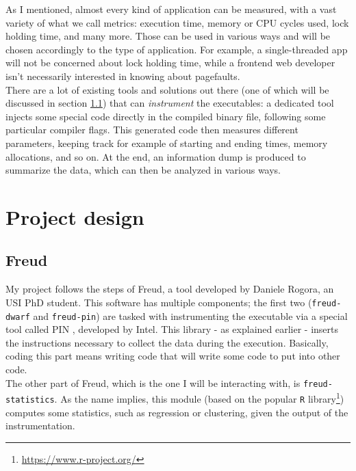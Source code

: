     As I mentioned, almost every kind of application can be measured, with a vast variety of what we call metrics:
    execution time, memory or CPU cycles used, lock holding time, and many more. Those can be used in
    various ways and will be chosen accordingly to the type of application. For example, a single-threaded app
    will not be concerned about lock holding time, while a frontend web developer isn't 
    necessarily interested in knowing about pagefaults.\\

    There are a lot of existing tools and solutions out there (one of which will be discussed in section \ref{sec:freud})
    that can \textit{instrument} the executables: a dedicated tool injects some special code directly in the compiled
    binary file, following some particular compiler flags. This generated code then measures
    different parameters, keeping track for example of starting and ending times, memory allocations, and so on.
    At the end, an information dump is produced to summarize the data, which can then be analyzed in various ways.


\chapter{Project design}

    \section{Freud}\label{sec:freud}


        My project follows the steps of Freud, a tool developed by Daniele Rogora, an USI PhD student.
        This software has multiple components; the first two (\texttt{freud-dwarf} and \texttt{freud-pin})
        are tasked with instrumenting the executable 
        via a special tool called PIN \cite{pin}, developed by Intel. This library - as explained earlier - 
        inserts the instructions necessary to collect the data during the execution. Basically, coding this
        part means writing code that will write some code to put into other code.\\

        The other part of Freud, which is the one I will be interacting with, is \texttt{freud-statistics}.
        As the name implies, this module (based on the popular \texttt{R} library\footnote{\url{https://www.r-project.org/}})
        computes some statistics, such as regression or clustering, given the output of the instrumentation.


